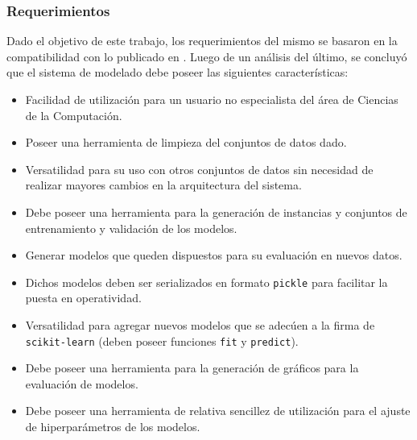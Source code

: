       \subsubsection{Requerimientos}
        \par Dado el objetivo de este trabajo, los requerimientos del mismo se
          basaron en la compatibilidad con lo publicado en \cite{porcasi_operative}.
          Luego de un análisis del último, se concluyó que el sistema de
          modelado debe poseer las siguientes características:
          \begin{itemize}
            \item Facilidad de utilización para un usuario no especialista del área de
              Ciencias de la Computación.

            \item Poseer una herramienta de limpieza del conjuntos de datos
              dado.

            \item Versatilidad para su uso con otros conjuntos de datos sin necesidad
              de realizar mayores cambios en la arquitectura del sistema.

            \item Debe poseer una herramienta para la generación de instancias y
              conjuntos de entrenamiento y validación de los modelos.

            \item Generar modelos que queden dispuestos para su evaluación en
              nuevos datos.

            \item Dichos modelos deben ser serializados en formato \verb|pickle|
              para facilitar la puesta en operatividad.

            \item Versatilidad para agregar nuevos modelos que se adecúen a la
              firma de \verb|scikit-learn| (deben poseer funciones \verb|fit| y
              \verb|predict|).

            \item Debe poseer una herramienta para la generación de gráficos
              para la evaluación de modelos.

            \item Debe poseer una herramienta de relativa sencillez de utilización
              para el ajuste de hiperparámetros de los modelos.
          \end{itemize}


